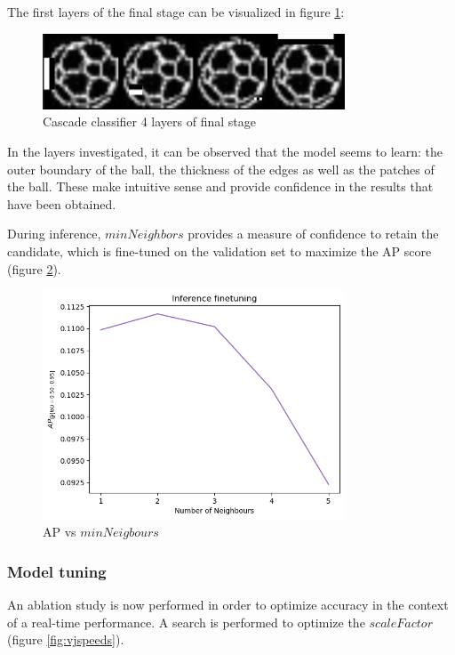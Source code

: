 \documentclass[a4paper,twoside,12pt]{report}
\begin{document}
The first layers of the final stage can be visualized in figure \ref{fig:vjlayers}:

\begin{figure}[h!]
\begin{center}
\includegraphics[width=9cm]{images/vj_result.jpg}
\caption{Cascade classifier 4 layers of final stage}
\label{fig:vjlayers}
\end{center}
\end{figure}

In the layers investigated, it can be observed that the model seems to learn: the outer boundary of the ball, the thickness of the edges as well as the patches of the ball. These make intuitive sense and provide confidence in the results that have been obtained.

During inference, $minNeighbors$ provides a measure of confidence to retain the candidate, which is fine-tuned on the validation set to maximize the AP score (figure \ref{fig:vjneighbors}).

\begin{figure}[h!]
\begin{center}
\includegraphics[width=9cm]{images/vj_tune.png}
\caption{AP vs $minNeigbours$}
\label{fig:vjneighbors}
\end{center}
\end{figure}

\subsubsection{Model tuning}

An ablation study is now performed in order to optimize accuracy in the context of a real-time performance. A search is performed to optimize the $scaleFactor$ (figure \ref{fig:vjspeeds}).
\end{document}
